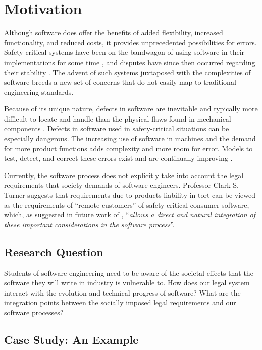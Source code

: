 \chapter{Motivation}

Although software does offer the benefits of added flexibility, increased
functionality, and reduced costs, it provides unprecedented possibilities for
errors. Safety-critical systems have been on the bandwagon of using software in
their implementations for some time \cite{Graupe78,Hurtig94}, and disputes have
since then occurred regarding their stability \cite{Therac25,Maisel05}. The 
advent of such systems juxtaposed with the complexities of software breeds a new
set of concerns that do not easily map to traditional engineering standards.

Because of its unique nature, defects in software are inevitable and typically
more difficult to locate and handle than the physical flaws found in mechanical
components \cite{Parnas90}. Defects in software used in safety-critical
situations can be especially dangerous. The increasing use of software in
machines and the demand for more product functions adds complexity and more room
for error. Models to test, detect, and correct these errors exist and are
continually improving \cite{Parnas90}.

Currently, the software process does not explicitly take into account the legal
requirements that society demands of software engineers. Professor Clark S. 
Turner suggests that requirements due to products liability in tort can be
viewed as the requirements of ``remote customers'' of safety-critical consumer
software, which, as suggested in future work of \cite{Turner99}, 
``\textit{allows a direct and natural integration of these important 
considerations in the software process}''.

\section{Research Question}

Students of software engineering need to be aware of the societal effects that
the software they will write in industry is vulnerable to. How does our legal
system interact with the evolution and technical progress of software? What are
the integration points between the socially imposed legal requirements and our
software processes?

\section{Case Study: An Example}

